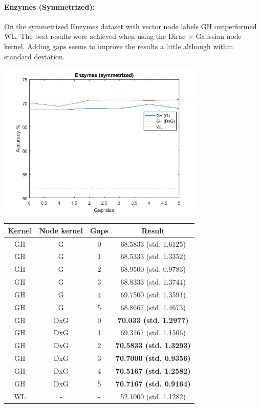 \documentclass{article}
\begin{document}
\paragraph{Enzymes (Symmetrized):}
On the symmetrized Enzymes dataset with vector node labels GH outperformed WL. The best results were achieved when using the Dirac $\times$ Gaussian node kernel. Adding gaps seems to improve the results a little although within standard deviation.\\
\begin{minipage}{0.6\linewidth}
	\hspace*{-1in}
	\includegraphics[width=10cm]{enzymes_symmetrized}
	\label{fig:enzymes_symmetrized}
\end{minipage}
\begin{minipage}[c]{0.5\linewidth}
	
	\centering
	\begin{tabular}{c|c|c|c}
		Kernel & Node kernel & Gaps & Result\\
		\hline
		GH & G & 0 & 68.5833 (std. 1.6125)\\
		GH & G & 1 & 68.5333 (std. 1.3352)\\
		GH & G & 2 & 68.9500 (std. 0.9783)\\
		GH & G & 3 & 68.8333 (std. 1.3744)\\
		GH & G & 4 & 69.7500 (std. 1.3591)\\
		GH & G & 5 & 68.8667 (std. 1.4673)\\
		GH & DxG & 0 & \textbf{70.033 (std. 1.2977)}\\
		GH & DxG & 1 & 69.3167 (std. 1.1506)\\
		GH & DxG & 2 & \textbf{70.5833 (std. 1.3293)}\\
		GH & DxG & 3 & \textbf{70.7000 (std. 0.9356)}\\
		GH & DxG & 4 & \textbf{70.5167 (std. 1.2582)}\\
		GH & DxG & 5 & \textbf{70.7167 (std. 0.9164)}\\
		WL & - & - & 52.1000 (std. 1.1282)
	\end{tabular}
	\label{table:enzymes_symmetrized}
\end{minipage}
\end{document}
